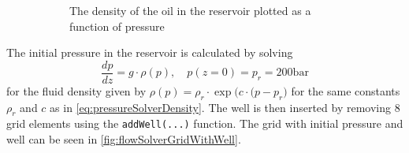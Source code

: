 \begin{figure}[htb]
\begin{subfigure}[t]{0.48\textwidth}
        \caption{The density of the oil in the reservoir plotted as a function of pressure}
        \label{fig:flowSolverPoreVolume}
    \end{subfigure}
    \caption{}
\end{figure}

The initial pressure in the reservoir is calculated by solving
\begin{equation*}
    \frac{dp}{dz} = g\cdot \rho(p), \quad p(z = 0) = p_r = 200\text{bar} 
\end{equation*}  
for the fluid density given by $\rho(p) = \rho_r\cdot\exp\big(c\cdot(p-p_r\big)$ for the same constants $\rho_r$ and $c$ as in \autoref{eq:pressureSolverDensity}. The well is then inserted by removing 8 grid elements using the \texttt{addWell(...)} function. The grid with initial pressure and well can be seen in \autoref{fig:flowSolverGridWithWell}.
